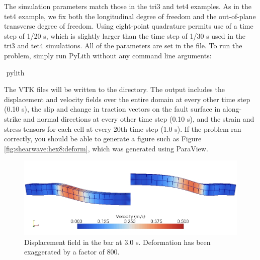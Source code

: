 The simulation parameters match those in the tri3 and tet4 examples.
As in the tet4 example, we fix both the longitudinal degree of freedom
and the out-of-plane transverse degree of freedom. Using eight-point
quadrature permits use of a time step of 1/20 s, which is slightly
larger than the time step of 1/30 s used in the tri3 and tet4 simulations.
All of the parameters are set in the  file.
To run the problem, simply run PyLith without any command line arguments:
\begin{shell}
$$ pylith
\end{shell}
The VTK files will be written to the  directory. The
output includes the displacement and velocity fields over the entire
domain at every other time step (0.10 s), the slip and change in traction
vectors on the fault surface in along-strike and normal directions
at every other time step (0.10 s), and the strain and stress tensors
for each cell at every 20th time step (1.0 s). If the problem ran
correctly, you should be able to generate a figure such as Figure
\vref{fig:shearwave:hex8:deform}, which was generated using ParaView.

\begin{figure}
  \includegraphics[scale=0.5]{examples/figs/shearwave_hex8deform30}
  \caption{Displacement field in the bar at 3.0 s. Deformation has been exaggerated
    by a factor of 800.}
  \label{fig:shearwave:hex8:deform}
\end{figure}


